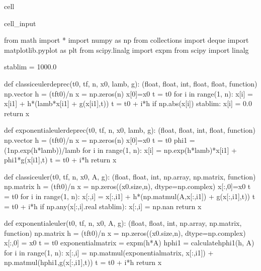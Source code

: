 \documentclass[letterpaper,10pt,english]{jupyterBook}
\begin{document}
\begin{sphinxuseclass}{cell}\begin{sphinxVerbatimInput}

\begin{sphinxuseclass}{cell_input}
\begin{sphinxVerbatim}[commandchars=\\\{\}]
from math import *
import numpy as np
from collections import deque
import matplotlib.pyplot as plt
from scipy.linalg import expm
from scipy import linalg

stab\PYGZus{}lim = 1000.0

def classic\PYGZus{}euler\PYGZus{}deprec(t0, tf, n, x0, lamb, g):
    \PYGZsq{}\PYGZsq{}\PYGZsq{}(float, float, int, float, float, function) \PYGZhy{}\PYGZgt{} np.vector\PYGZsq{}\PYGZsq{}\PYGZsq{}
    h = (tf\PYGZhy{}t0)/n
    x = np.zeros(n)
    x[0]=x0
    t = t0
    for i in range(1, n):
        x[i] = x[i\PYGZhy{}1] + h*(\PYGZhy{}lamb*x[i\PYGZhy{}1] + g(x[i\PYGZhy{}1],t))
        t = t0 + i*h
        if np.abs(x[i]) \PYGZgt{} stab\PYGZus{}lim:
            x[i] = 0.0
    return x

def exponential\PYGZus{}euler\PYGZus{}deprec(t0, tf, n, x0, lamb, g):
    \PYGZsq{}\PYGZsq{}\PYGZsq{}(float, float, int, float, function) \PYGZhy{}\PYGZgt{} np.vector\PYGZsq{}\PYGZsq{}\PYGZsq{}
    h = (tf\PYGZhy{}t0)/n
    x = np.zeros(n)
    x[0]=x0
    t = t0
    phi1 = (1\PYGZhy{}np.exp(\PYGZhy{}h*lamb))/lamb
    for i in range(1, n):
        x[i] = np.exp(\PYGZhy{}h*lamb)*x[i\PYGZhy{}1] + phi1*g(x[i\PYGZhy{}1],t)
        t = t0 + i*h
    return x

def classic\PYGZus{}euler(t0, tf, n, x0, A, g):
    \PYGZsq{}\PYGZsq{}\PYGZsq{}(float, float, int, np.array, np.matrix, function) \PYGZhy{}\PYGZgt{} np.matrix\PYGZsq{}\PYGZsq{}\PYGZsq{}
    h = (tf\PYGZhy{}t0)/n
    x = np.zeros((x0.size,n), dtype=np.complex\PYGZus{})
    x[:,0]=x0
    t = t0
    for i in range(1, n):
        x[:,i] = x[:,i\PYGZhy{}1] + h*(np.matmul(\PYGZhy{}A,x[:,i\PYGZhy{}1]) + g(x[:,i\PYGZhy{}1],t))
        t = t0 + i*h
        if np.any(x[:,i].real \PYGZgt{} stab\PYGZus{}lim):
            x[:,i] = np.nan
    return x

def exponential\PYGZus{}euler(t0, tf, n, x0, A, g):
    \PYGZsq{}\PYGZsq{}\PYGZsq{}(float, float, int, np.array, np.matrix, function) \PYGZhy{}\PYGZgt{} np.matrix\PYGZsq{}\PYGZsq{}\PYGZsq{}
    h = (tf\PYGZhy{}t0)/n
    x = np.zeros((x0.size,n), dtype=np.complex\PYGZus{})
    x[:,0] = x0
    t = t0
    exponential\PYGZus{}matrix = expm(\PYGZhy{}h*A)
    hphi1 = calculate\PYGZus{}hphi1(h, A)
    for i in range(1, n):
        x[:,i] = np.matmul(exponential\PYGZus{}matrix, x[:,i\PYGZhy{}1]) + np.matmul(hphi1,g(x[:,i\PYGZhy{}1],t))
        t = t0 + i*h
    return x


\end{sphinxVerbatim}
\end{sphinxuseclass}
\end{sphinxVerbatimInput}
\end{sphinxuseclass}
\end{document}
